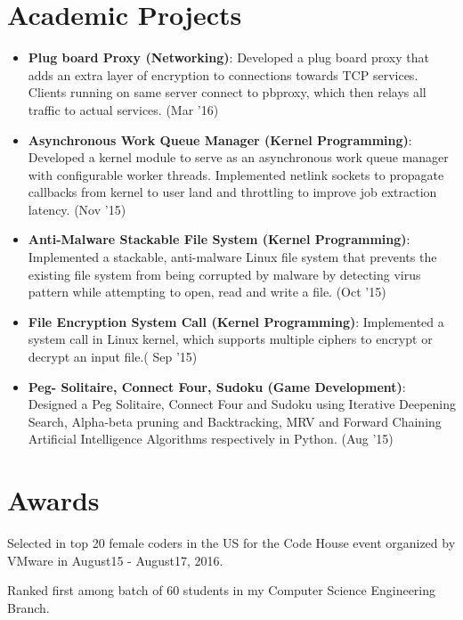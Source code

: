 \documentclass[letterpaper,10.8pt]{article}
\newcommand{\resumeItem}[2]{
  \item\small{
    \textbf{#1}{: #2 \vspace{-2pt}}
  }
}
\newcommand{\resumeSubItem}[2]{\resumeItem{#1}{#2}\vspace{-4pt}}
\newcommand{\resumeSubHeadingListStart}{\begin{itemize}[leftmargin=*]}
\newcommand{\resumeSubHeadingListEnd}{\end{itemize}}
\begin{document}
\section{Academic Projects}
\resumeSubHeadingListStart
\resumeSubItem{Plug board Proxy (Networking)}{Developed a plug board proxy that adds an extra layer of encryption to connections towards TCP services. Clients running on same server connect to pbproxy, which then relays all traffic to actual services. (Mar '16)}
\resumeSubItem{Asynchronous Work Queue Manager (Kernel Programming)}{Developed a kernel module to serve as an asynchronous work queue manager with configurable worker threads. Implemented netlink sockets to propagate callbacks from kernel to user land and throttling to improve job extraction latency. (Nov '15)}
\resumeSubItem{Anti-Malware Stackable File System (Kernel Programming)}{Implemented a stackable, anti-malware Linux file system that prevents the existing file system from being corrupted by malware by detecting virus pattern while attempting to open, read and write a file. (Oct '15)}
\resumeSubItem{File Encryption System Call (Kernel Programming)}{Implemented a system call in Linux kernel, which supports multiple ciphers to encrypt or decrypt an input file.( Sep '15)}
\resumeSubItem{Peg- Solitaire, Connect Four, Sudoku (Game Development)}{Designed a Peg Solitaire, Connect Four and Sudoku using Iterative Deepening Search, Alpha-beta pruning and Backtracking, MRV and Forward Chaining Artificial Intelligence Algorithms respectively in Python. (Aug '15)}
\resumeSubHeadingListEnd

\section{Awards}
\begin{description}[font=$\bullet$]
\item {Selected in top 20 female coders in the US for the Code House event organized by VMware in August15 - August17, 2016.}
\item {Ranked first among batch of 60 students in my Computer Science Engineering Branch.}
\end{description}
\end{document}

